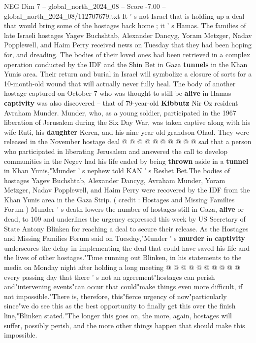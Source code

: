 \begin{textsample}{NEG Dim 7 – global\_north\_2024\_08 – Score -7.00 – global\_north\_2024\_08/112707679.txt}  \label{ex:f7_neg_090}
It ' s not Israel that is holding up a deal that would bring some of the hostages back home ; it ' s Hamas.
The families of late Israeli hostages Yagev Buchshtab, Alexander Dancyg, Yoram Metzger, Nadav Popplewell, and Haim Perry received news on Tuesday that they had been hoping for, and dreading.
The bodies of their loved ones had been retrieved in a complex operation conducted by the IDF and the Shin Bet in Gaza \textbf{tunnels} in the Khan Yunis area.
Their return and burial in Israel will symbolize a closure of sorts for a 10-month-old wound that will actually never fully heal.
The body of another hostage captured on October 7 who was thought to still be \textbf{alive} in Hamas \textbf{captivity} was also discovered -- that of 79-year-old \textbf{Kibbutz} Nir Oz resident Avraham Munder.
Munder, who, as a young soldier, participated in the 1967 liberation of Jerusalem during the Six Day War, was taken captive along with his wife Ruti, his \textbf{daughter} Keren, and his nine-year-old grandson Ohad.
They were released in the November hostage deal @ @ @ @ @ @ @ @ @ @ sad that a person who participated in liberating Jerusalem and answered the call to develop communities in the Negev had his life ended by being \textbf{thrown} aside in a \textbf{tunnel} in Khan Yunis,"Munder ' s nephew told KAN ' s Reshet Bet.The bodies of hostages Yagev Buchshtab, Alexander Dancyg, Avraham Munder, Yoram Metzger, Nadav Popplewell, and Haim Perry were recovered by the IDF from the Khan Yunis area in the Gaza Strip. ( credit : Hostages and Missing Families Forum ) Munder ' s death lowers the number of hostages still in Gaza, \textbf{alive} or dead, to 109 and underlines the urgency expressed this week by US Secretary of State Antony Blinken for reaching a deal to secure their release.
As the Hostages and Missing Families Forum said on Tuesday,"Munder ' s \textbf{murder} in \textbf{captivity} underscores the delay in implementing the deal that could have saved his life and the lives of other hostages."Time running out Blinken, in his statements to the media on Monday night after holding a long meeting @ @ @ @ @ @ @ @ @ @ every passing day that there ' s not an agreement"hostages can perish and"intervening events"can occur that could"make things even more difficult, if not impossible."There is, therefore, this"fierce urgency of now"particularly since"we do see this as the best opportunity to finally get this over the finish line,"Blinken stated."The longer this goes on, the more, again, hostages will suffer, possibly perish, and the more other things happen that should make this impossible.

\end{textsample}

